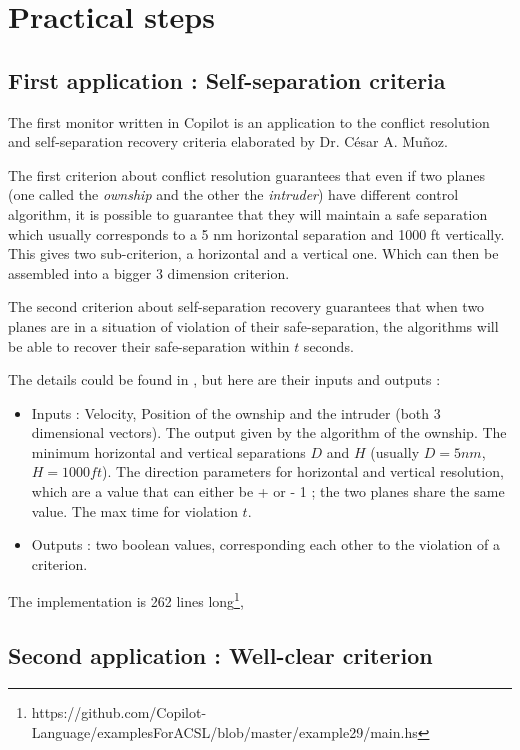 \documentclass[a4paper,11pt,final]{article}
\begin{document}
  \section{Practical steps}
  \subsection{First application : Self-separation criteria}
  
  The first monitor written in Copilot is an application to the conflict resolution and self-separation recovery criteria elaborated by Dr. César A. Muñoz. 
  
  The first criterion about conflict resolution guarantees that even if two planes (one called the \emph{ownship} and the other the \emph{intruder}) have different control algorithm, it is possible to guarantee that they will maintain a safe separation which usually corresponds to a 5 nm horizontal separation and 1000 ft vertically. This gives two sub-criterion, a horizontal and a vertical one. Which can then be assembled into a bigger 3 dimension criterion.
  
  The second criterion about self-separation recovery guarantees that when two planes are in a situation of violation of their safe-separation, the algorithms will be able to recover their safe-separation within $t$ seconds.
  
  The details could be found in \cite{MBNMH2010NASA}, but here are their inputs and outputs :
  \begin{itemize}
  	\item Inputs : Velocity, Position of the ownship and the intruder (both 3 dimensional vectors). The output given by the algorithm of the ownship. The minimum horizontal and vertical separations $D$ and $H$ (usually $D = 5nm$, $H=1000ft$). The direction parameters for horizontal and vertical resolution, which are a value that can either be + or - 1 ; the two planes share the same value. The max time for violation $t$.
  	\item Outputs : two boolean values, corresponding each other to the violation of a criterion.
  \end{itemize}
  
  The implementation is 262 lines long\footnote{https://github.com/Copilot-Language/examplesForACSL/blob/master/example29/main.hs}, 
  
  \subsection{Second application : Well-clear criterion}
\end{document}

